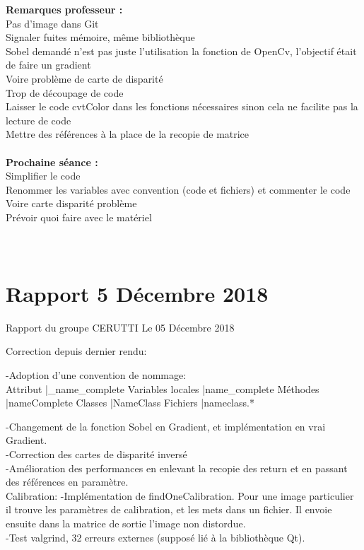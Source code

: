 \documentclass{article}
\begin{document}
\textbf{Remarques professeur :}\\
Pas d'image dans Git\\
Signaler fuites mémoire, même bibliothèque\\
Sobel demandé n'est pas juste l'utilisation la fonction de OpenCv, l'objectif était de faire un gradient\\
Voire problème de carte de disparité\\
Trop de découpage  de code\\
Laisser le code cvtColor dans les fonctions nécessaires sinon cela ne facilite pas la lecture de code\\
Mettre des références à la place de la recopie de matrice
\\\\

\textbf{Prochaine séance :}\\
Simplifier le code\\
Renommer les variables avec convention (code et fichiers) et commenter le code\\
Voire carte disparité problème\\
Prévoir quoi faire avec le matériel\\
\\\\

\newpage
\section{Rapport 5 Décembre 2018}
Rapport du groupe CERUTTI
Le 05 Décembre 2018


Correction depuis dernier rendu:

    -Adoption d'une convention de nommage:\\
Attribut                        |\_name\_complete            
Variables locales         		|name\_complete                
Méthodes                    	|nameComplete
Classes                        	|NameClass
Fichiers                        |nameclass.*

    -Changement de la fonction Sobel en Gradient, et implémentation en vrai Gradient.\\
    -Correction des cartes de disparité inversé\\
    -Amélioration des performances en enlevant la recopie des return et en passant des références en paramètre.\\
   

Calibration:
    -Implémentation de findOneCalibration. Pour une image particulier il trouve les paramètres de calibration,
et les mets dans un fichier. Il envoie ensuite dans la matrice de sortie l'image non distordue.\\
    -Test valgrind, 32 erreurs externes (supposé lié à la bibliothèque Qt).\\
\end{document}
